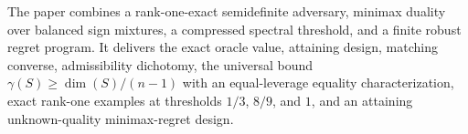 The paper combines a rank-one-exact semidefinite adversary, minimax duality over balanced sign mixtures, a compressed spectral threshold, and a finite robust regret program. It delivers the exact oracle value, attaining design, matching converse, admissibility dichotomy, the universal bound \(\gamma(S)\geq\dim(S)/(n-1)\) with an equal-leverage equality characterization, exact rank-one examples at thresholds \(1/3\), \(8/9\), and \(1\), and an attaining unknown-quality minimax-regret design.